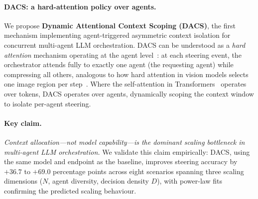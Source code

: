 \documentclass{article}
\begin{document}
\paragraph{DACS: a hard-attention policy over agents.}
We propose \textbf{Dynamic Attentional Context Scoping (DACS)},
the first mechanism implementing agent-triggered asymmetric context
isolation for concurrent multi-agent LLM orchestration.
DACS can be understood as a \emph{hard attention} mechanism operating
at the agent level~\citep{xu2015show}: at each steering event,
the orchestrator attends fully to exactly one agent (the requesting
agent) while compressing all others, analogous to how hard attention
in vision models selects one image region per
step~\citep{bahdanau2015attention}.
Where the self-attention in Transformers~\citep{vaswani2017attention}
operates over tokens, DACS operates over agents,
dynamically scoping the context window to isolate per-agent steering.

\paragraph{Key claim.}
\emph{Context allocation---not model capability---is the dominant scaling
bottleneck in multi-agent LLM orchestration.}
We validate this claim empirically:
DACS, using the same model and endpoint as the baseline, improves
steering accuracy by $+36.7$ to $+69.0$ percentage points across
eight scenarios spanning three scaling dimensions ($N$, agent diversity,
decision density $D$), with power-law fits confirming the predicted
scaling behaviour.
\end{document}
